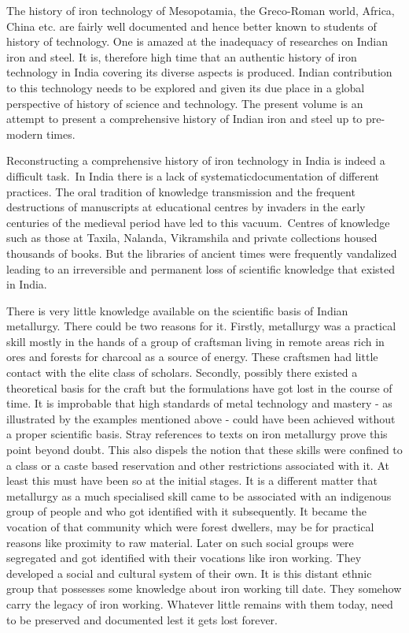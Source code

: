 The history of iron technology of Mesopotamia, the Greco-Roman world, Africa, China etc. are fairly well documented and hence better known to students of history of technology. One is amazed at the inadequacy of researches on Indian iron and steel. It is, therefore high time that an authentic history of iron technology in India covering its diverse aspects is produced. Indian contribution to this technology needs to be explored and given its due place in a global perspective of history of science and technology. The present volume is an attempt to present a comprehensive history of Indian iron and steel up to pre-modern times.

Reconstructing a comprehensive history of iron technology in India is indeed a difficult task.~In India there is a lack of systematic\break documentation of different practices. The oral tradition of knowledge transmission and the frequent destructions of manuscripts at educational centres by invaders in the early centuries of the medieval period have led to this vacuum.~Centres of knowledge such as those at Taxila, Nalanda, Vikramshila and private collections housed thousands of books. But the libraries of ancient times were frequently vandalized leading to an irreversible and permanent loss of scientific knowledge that existed in India.

There is very little knowledge available on the scientific basis of Indian metallurgy. There could be two reasons for it. Firstly, metallurgy was a practical skill mostly in the hands of a group of craftsman living in remote areas rich in ores and forests for charcoal as a source of energy. These craftsmen had little contact with the elite class of scholars. Secondly, possibly there existed a theoretical basis for the craft but the formulations have got lost in the course of time. It is improbable that high standards of metal technology and mastery - as illustrated by the examples mentioned above - could have been achieved without a proper scientific basis. Stray references to texts on iron metallurgy prove this point beyond doubt. This also dispels the notion that these skills were confined to a class or a caste based reservation and other restrictions associated with it. At least this must have been so at the initial stages. It is a different matter that metallurgy as a much specialised skill came to be associated with an indigenous  group of people and who got identified with it subsequently. It became the vocation of that community which were forest dwellers, may be for practical reasons like proximity to raw material. Later on such social groups were segregated and got identified with their vocations like iron working. They developed a social and cultural system of their own. It is this distant ethnic group that possesses some knowledge about iron working till date. They somehow carry the legacy of iron working. Whatever little remains with them today, need to be preserved and documented lest it gets lost forever.

